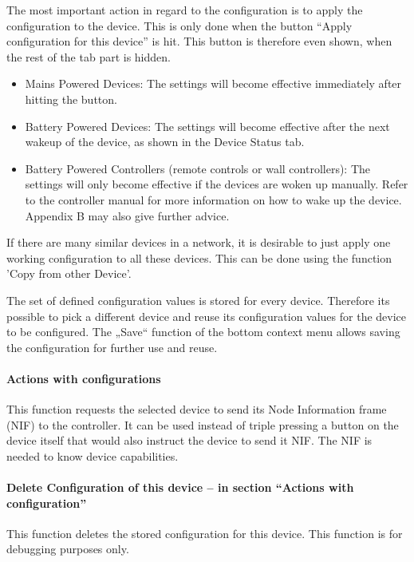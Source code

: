The most important action in regard to the configuration is to apply the configuration to the device. This is only done when the button “Apply configuration for this device” is hit. This button is therefore even shown, when the rest of the tab part is hidden.
\begin{itemize}
\item Mains Powered Devices: The settings will become effective immediately after hitting the button.
\item Battery Powered Devices: The settings will become effective after the next wakeup of the device, as shown in the Device Status tab.
\item Battery Powered Controllers (remote controls or wall controllers): The settings will only become effective if the devices are woken up manually. Refer to the controller manual for more information on how to wake up the device. Appendix B may also give further advice.
\end{itemize}

If there are many similar devices in a network, it is desirable to just apply one working configuration to all these devices. This can be done using the function 'Copy from other Device'.

The set of defined configuration values is stored for every device. Therefore its possible to pick a different device and reuse its configuration values for the device to be configured.  
The „Save“ function of the bottom context menu allows saving the configuration for further use and reuse.

\paragraph{Actions with configurations} 

This function requests the selected device to send its Node Information frame (NIF) to the controller. It can be used instead of triple pressing a button on the device itself that would also instruct the device 
to send it NIF. The NIF is needed to know device capabilities.

\paragraph{Delete Configuration of this device – in section “Actions with configuration”}

This function deletes the stored configuration for this device. This function is for debugging purposes only.

